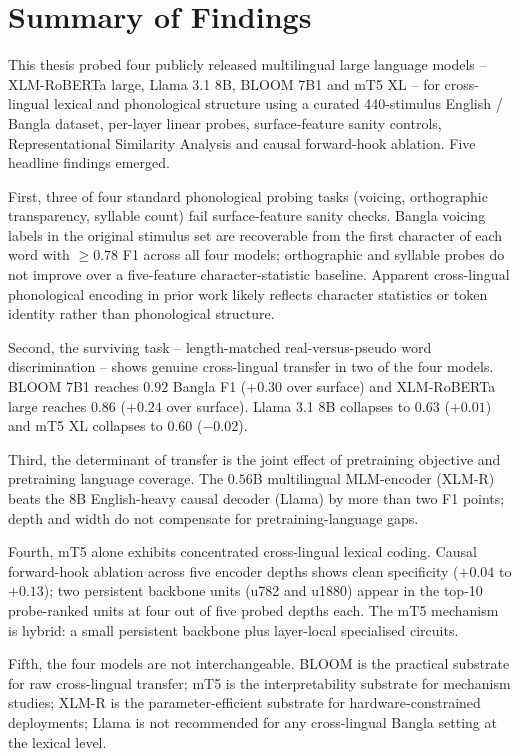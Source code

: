 \section{Summary of Findings}

This thesis probed four publicly released multilingual large language models -- XLM-RoBERTa large, Llama 3.1 8B, BLOOM 7B1 and mT5 XL -- for cross-lingual lexical and phonological structure using a curated 440-stimulus English / Bangla dataset, per-layer linear probes, surface-feature sanity controls, Representational Similarity Analysis and causal forward-hook ablation. Five headline findings emerged.

First, three of four standard phonological probing tasks (voicing, orthographic transparency, syllable count) fail surface-feature sanity checks. Bangla voicing labels in the original stimulus set are recoverable from the first character of each word with $\geq 0.78$ F1 across all four models; orthographic and syllable probes do not improve over a five-feature character-statistic baseline. Apparent cross-lingual phonological encoding in prior work likely reflects character statistics or token identity rather than phonological structure.

Second, the surviving task -- length-matched real-versus-pseudo word discrimination -- shows genuine cross-lingual transfer in two of the four models. BLOOM 7B1 reaches $0.92$ Bangla F1 ($+0.30$ over surface) and XLM-RoBERTa large reaches $0.86$ ($+0.24$ over surface). Llama 3.1 8B collapses to $0.63$ ($+0.01$) and mT5 XL collapses to $0.60$ ($-0.02$).

Third, the determinant of transfer is the joint effect of pretraining objective and pretraining language coverage. The $0.56$B multilingual MLM-encoder (XLM-R) beats the $8$B English-heavy causal decoder (Llama) by more than two F1 points; depth and width do not compensate for pretraining-language gaps.

Fourth, mT5 alone exhibits concentrated cross-lingual lexical coding. Causal forward-hook ablation across five encoder depths shows clean specificity ($+0.04$ to $+0.13$); two persistent backbone units (u782 and u1880) appear in the top-10 probe-ranked units at four out of five probed depths each. The mT5 mechanism is hybrid: a small persistent backbone plus layer-local specialised circuits.

Fifth, the four models are not interchangeable. BLOOM is the practical substrate for raw cross-lingual transfer; mT5 is the interpretability substrate for mechanism studies; XLM-R is the parameter-efficient substrate for hardware-constrained deployments; Llama is not recommended for any cross-lingual Bangla setting at the lexical level.

